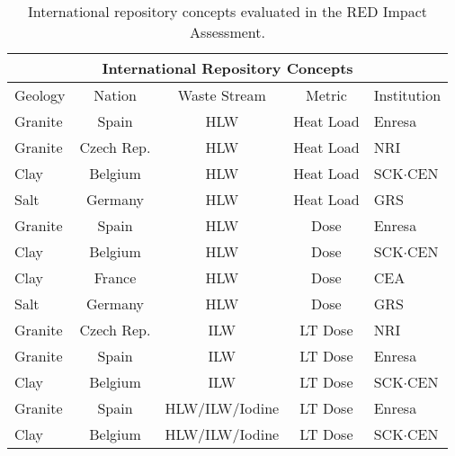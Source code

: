
\begin{table}[h!]
  \centering
  \footnotesize{
  \begin{tabularx}{\textwidth}{|l|c|c|c|X|}
    \multicolumn{5}{c}{\textbf{International Repository Concepts}}\\
    \hline
    Geology     & Nation      & Waste Stream   & Metric    & Institution \\
    \hline 
    Granite     & Spain       & HLW            & Heat Load & Enresa  \\
    Granite     & Czech Rep.  & HLW            & Heat Load & NRI \\
    Clay        & Belgium     & HLW            & Heat Load & SCK$\cdot$CEN \\
    Salt        & Germany     & HLW            & Heat Load & GRS \\
    Granite     & Spain       & HLW            & Dose      & Enresa  \\
    Clay        & Belgium     & HLW            & Dose      & SCK$\cdot$CEN \\
    Clay        & France      & HLW            & Dose      & CEA \\
    Salt        & Germany     & HLW            & Dose      & GRS  \\
    Granite     & Czech Rep.  & ILW            & LT Dose   & NRI  \\
    Granite     & Spain       & ILW            & LT Dose   & Enresa  \\
    Clay        & Belgium     & ILW            & LT Dose   & SCK$\cdot$CEN  \\
    Granite     & Spain       & HLW/ILW/Iodine & LT Dose   & Enresa \\
    Clay        & Belgium     & HLW/ILW/Iodine & LT Dose   & SCK$\cdot$CEN \\
    \hline
  \end{tabularx}
  \caption[International repository concepts.]{International repository concepts evaluated in the RED Impact 
  Assessment.\cite{von_lensa_red-impact_2008}}
  \label{tab:red}
  }
\end{table}


